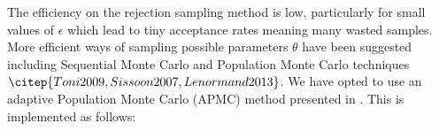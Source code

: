 \documentclass[a4paper,10pt]{article}
\begin{document}
The efficiency on the rejection sampling method is low, particularly for small values of $\epsilon$ which lead to tiny acceptance rates meaning many wasted samples. 
More efficient ways of sampling possible parameters $\theta$ have been suggested including Sequential Monte Carlo and Population Monte Carlo techniques $\citep{Toni2009, Sissoon2007,Lenormand2013}$.
We have opted to use an adaptive Population Monte Carlo (APMC) method presented in \citet{Lenormand2013}. 
This is implemented as follows:
\begin{itemize}

\end{itemize}





\end{document}
